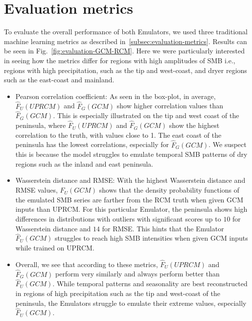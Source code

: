 \documentclass[a4paper,11pt,oneside]{report}
\begin{document}
\section{Evaluation metrics}
To evaluate the overall performance of both Emulators, we used three traditional machine learning metrics as described in~\ref{subsec:evaluation-metrics}. Results can be seen in Fig.~\ref{fig:evaluation-GCM-RCM}. Here we were particularly interested in seeing how the metrics differ for regions with high amplitudes of SMB i.e., regions with high precipitation, such as the tip and west-coast, and dryer regions such as the east-coast and mainland. 
\begin{itemize}
    \item Pearson correlation coefficient: As seen in the box-plot, in average, $\hat{F}_{U}(UPRCM)$ and $\hat{F}_{G}(GCM)$ show higher correlation values than $\hat{F}_{G}(GCM)$. This is especially illustrated on the tip and west coast of the peninsula, where $\hat{F}_{U}(UPRCM)$ and $\hat{F}_{G}(GCM)$ show the highest correlation to the truth, with values close to 1. The east coast of the peninsula has the lowest correlations, especially for $\hat{F}_{G}(GCM)$. We suspect this is because the model struggles to emulate temporal SMB patterns of dry regions such as the inland and east peninsula. 
    \item Wasserstein distance and RMSE: With the highest Wasserstein distance and RMSE values, $\hat{F}_{U}(GCM)$ shows that the density probability functions of the emulated SMB series are farther from the RCM truth when given GCM inputs than UPRCM. For this particular Emulator, the peninsula shows high differences in distributions with outliers with significant scores up to $10$ for Wasserstein distance and $14$ for RMSE. This hints that the Emulator $\hat{F}_{U}(GCM)$  struggles to reach high SMB intensities when given GCM inputs while trained on UPRCM.   
    \item Overall, we see that according to these metrics, $\hat{F}_{U}(UPRCM)$ and $\hat{F}_{G}(GCM)$ perform very similarly and always perform better than $\hat{F}_{U}(GCM)$. While temporal patterns and seasonality are best reconstructed in regions of high precipitation such as the tip and west-coast of the peninsula, the Emulators struggle to emulate their extreme values, especially $\hat{F}_{U}(GCM)$. 
\end{itemize}
\end{document}
